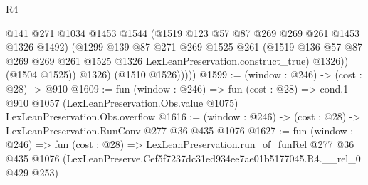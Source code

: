 \begin{lexlean}{R4}
\begin{coremodule}
                  @141
                  @271
                  @1034
                  @1453
                  @1544
                  (@1519 @123 @57 @87 @269 @269 @261 @1453 @1326 @1492)
                  (@1299
                    @139
                    @87
                    @271
                    @269
                    @1525
                    @261
                    (@1519
                      @136
                      @57
                      @87
                      @269
                      @269
                      @261
                      @1525
                      @1326
                      LexLeanPreservation.construct_true)
                    @1326))
                (@1504 @1525))
              @1326)
            (@1510 @1526)))))
@1599 := (window : @246) -> (cost : @28) -> @910
@1609 := fun (window : @246) =>
  fun (cost : @28) =>
  cond.{1} @910 @1057 (LexLeanPreservation.Obs.value @1075) LexLeanPreservation.Obs.overflow
@1616 := (window : @246) -> (cost : @28) -> LexLeanPreservation.RunConv @277 @36 @435 @1076
@1627 := fun (window : @246) =>
  fun (cost : @28) =>
  LexLeanPreservation.run_of_funRel
    @277
    @36
    @435
    @1076
    (LexLeanPreserve.Cef5f7237dc31ed934ee7ae01b5177045.R4.__rel_0 @429 @253)
\end{coremodule}
\end{lexlean}
